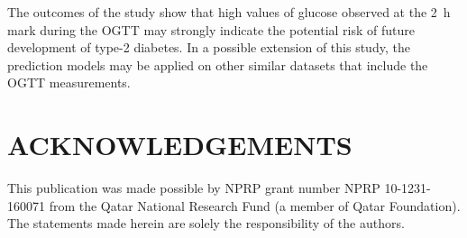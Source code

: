 \documentclass[a4paper,twoside]{article}
\begin{document}
The outcomes of the study show that high values of glucose observed at the \SI{2}{\hour} mark during the OGTT may strongly indicate the potential risk of future development of type-2 diabetes. In a possible extension of this study, the prediction models may be applied on other similar datasets that include the OGTT measurements.

\section*{\uppercase{Acknowledgements}}

\noindent This publication was made possible by NPRP grant number NPRP 10-1231-160071 from the Qatar National Research Fund (a member of Qatar Foundation). The statements made herein are solely the responsibility of the authors.



{\small
}

\vfill
\end{document}
